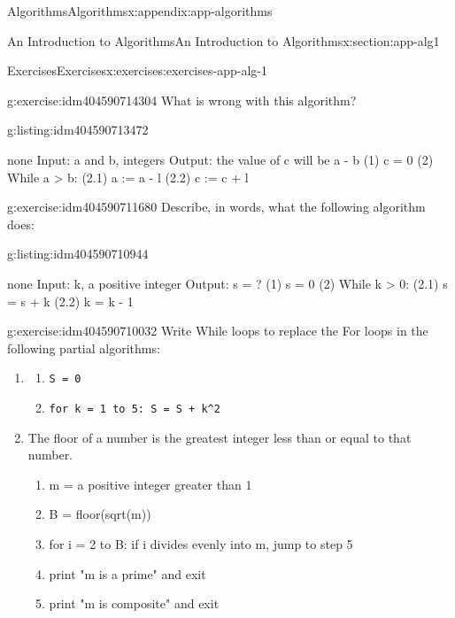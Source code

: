 \documentclass[twoside,10pt,]{book}
\newcommand{\mono}[1]{\texttt{#1}}
\numberwithin{equation}{section}
\begin{document}
\begin{appendixptx}{Algorithms}{}{Algorithms}{}{}{x:appendix:app-algorithms}
\begin{sectionptx}{An Introduction to Algorithms}{}{An Introduction to Algorithms}{}{}{x:section:app-alg1}
\begin{exercises-subsection}{Exercises}{}{Exercises}{}{}{x:exercises:exercises-app-alg-1}
\begin{divisionexercise}{2}{}{}{g:exercise:idm404590714304}
What is wrong with this algorithm?%
\begin{listingptx}{}{g:listing:idm404590713472}{}%
\begin{program}{none}
Input: a and b, integers
Output: the value of c will be a - b
(1) c = 0
(2) While a > b:
		(2.1) a := a - l
		(2.2) c := c + l
\end{program}
\tcblower
\end{listingptx}%
\end{divisionexercise}%
\begin{divisionexercise}{3}{}{}{g:exercise:idm404590711680}%
Describe, in words, what the following algorithm does:%
\begin{listingptx}{}{g:listing:idm404590710944}{}%
\begin{program}{none}
Input: k, a positive integer
Output: s = ?
(1) s = 0
(2) While k > 0:
    (2.1) s = s + k
    (2.2) k = k - 1
\end{program}
\tcblower
\end{listingptx}%
\end{divisionexercise}%
\begin{divisionexercise}{4}{}{}{g:exercise:idm404590710032}%
Write While loops to replace the For loops in the following partial algorithms:%
\par
%
\begin{enumerate}[label=(\alph*)]
\item{}%
\begin{enumerate}[label=(\arabic*)]
\item{}\mono{S = 0}%
\item{}\mono{for k = 1 to 5:  S = S + k\textasciicircum{}2}%
\end{enumerate}
%
\item{}The floor of a number is the greatest integer less than or equal to that number.%
\par
%
\begin{enumerate}[label=(\arabic*)]
\item{}m = a positive integer greater than 1%
\item{}B = floor(sqrt(m))%
\item{}for i = 2 to B: if i divides evenly into m, jump to step 5%
\item{}print "m is a prime" and exit%
\item{}print "m is composite"  and exit%
\end{enumerate}
%
\end{enumerate}
%
\end{divisionexercise}%

\end{exercises-subsection}
\end{sectionptx}
\end{appendixptx}
\end{document}
